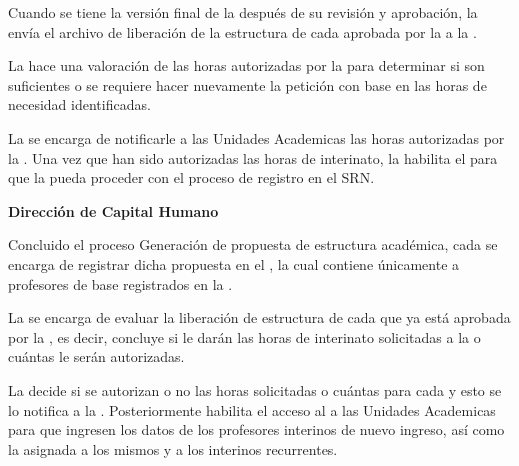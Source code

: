 \begin{PDescripcion}
\begin{enumerate}
		\Ppaso[\PSubProceso] 
		Cuando se tiene la versión final de la  después de su revisión y aprobación, la  envía el archivo de liberación de la estructura de cada  aprobada por la  a la .
		
		\Ppaso[\PSubProceso] 
		La  hace una valoración de las horas autorizadas por la  para determinar si son suficientes o se requiere hacer nuevamente la petición con base en las horas de necesidad identificadas.
		
		\Ppaso[\PSubProceso] 
		La  se encarga de notificarle a las Unidades Academicas las horas autorizadas por la . Una vez que han sido autorizadas las horas de interinato, la  habilita el  para que la  pueda proceder con el proceso de registro en el SRN.
		
		\end{enumerate}
	
	\Ppaso \textbf{Dirección de Capital Humano}
	
	\begin{enumerate}
		\Ppaso[\PSubProceso] 
		Concluido el proceso Generación de propuesta de estructura académica, cada  se encarga de registrar dicha propuesta en el , la cual contiene únicamente a profesores de base registrados en la .
		
		\Ppaso[\PSubProceso] 
		La  se encarga de evaluar la liberación de estructura de cada  que ya está aprobada por la , es decir, concluye si le darán las horas de interinato solicitadas a la  o cuántas le serán autorizadas.
		
		\Ppaso[\PSubProceso] 
		La  decide si se autorizan o no las horas solicitadas o cuántas para cada  y esto se lo notifica a la . Posteriormente habilita el acceso al  a las Unidades Academicas para que ingresen los datos de los profesores interinos de nuevo ingreso, así como la  asignada a los mismos y a los interinos recurrentes.


\end{enumerate}
\end{PDescripcion}

